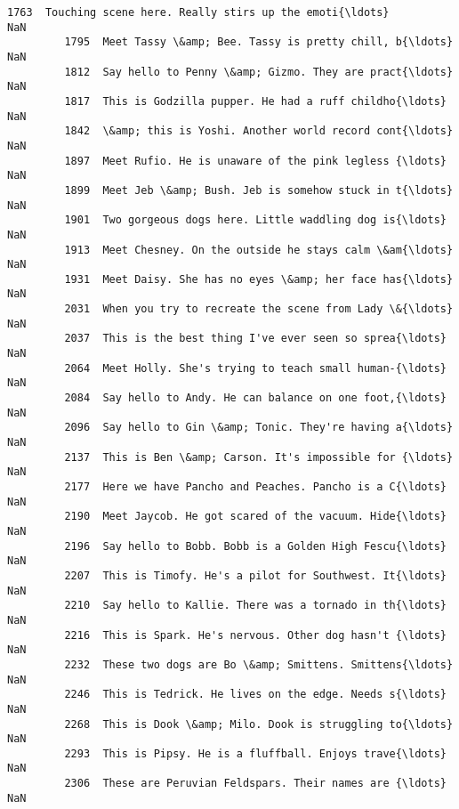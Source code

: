 \documentclass[11pt]{article}
\begin{document}
\begin{Verbatim}[commandchars=\\\{\}]
         1763  Touching scene here. Really stirs up the emoti{\ldots}                  NaN   
         1795  Meet Tassy \&amp; Bee. Tassy is pretty chill, b{\ldots}                  NaN   
         1812  Say hello to Penny \&amp; Gizmo. They are pract{\ldots}                  NaN   
         1817  This is Godzilla pupper. He had a ruff childho{\ldots}                  NaN   
         1842  \&amp; this is Yoshi. Another world record cont{\ldots}                  NaN   
         1897  Meet Rufio. He is unaware of the pink legless {\ldots}                  NaN   
         1899  Meet Jeb \&amp; Bush. Jeb is somehow stuck in t{\ldots}                  NaN   
         1901  Two gorgeous dogs here. Little waddling dog is{\ldots}                  NaN   
         1913  Meet Chesney. On the outside he stays calm \&am{\ldots}                  NaN   
         1931  Meet Daisy. She has no eyes \&amp; her face has{\ldots}                  NaN   
         2031  When you try to recreate the scene from Lady \&{\ldots}                  NaN   
         2037  This is the best thing I've ever seen so sprea{\ldots}                  NaN   
         2064  Meet Holly. She's trying to teach small human-{\ldots}                  NaN   
         2084  Say hello to Andy. He can balance on one foot,{\ldots}                  NaN   
         2096  Say hello to Gin \&amp; Tonic. They're having a{\ldots}                  NaN   
         2137  This is Ben \&amp; Carson. It's impossible for {\ldots}                  NaN   
         2177  Here we have Pancho and Peaches. Pancho is a C{\ldots}                  NaN   
         2190  Meet Jaycob. He got scared of the vacuum. Hide{\ldots}                  NaN   
         2196  Say hello to Bobb. Bobb is a Golden High Fescu{\ldots}                  NaN   
         2207  This is Timofy. He's a pilot for Southwest. It{\ldots}                  NaN   
         2210  Say hello to Kallie. There was a tornado in th{\ldots}                  NaN   
         2216  This is Spark. He's nervous. Other dog hasn't {\ldots}                  NaN   
         2232  These two dogs are Bo \&amp; Smittens. Smittens{\ldots}                  NaN   
         2246  This is Tedrick. He lives on the edge. Needs s{\ldots}                  NaN   
         2268  This is Dook \&amp; Milo. Dook is struggling to{\ldots}                  NaN   
         2293  This is Pipsy. He is a fluffball. Enjoys trave{\ldots}                  NaN   
         2306  These are Peruvian Feldspars. Their names are {\ldots}                  NaN   
         

\end{Verbatim}
\end{document}
